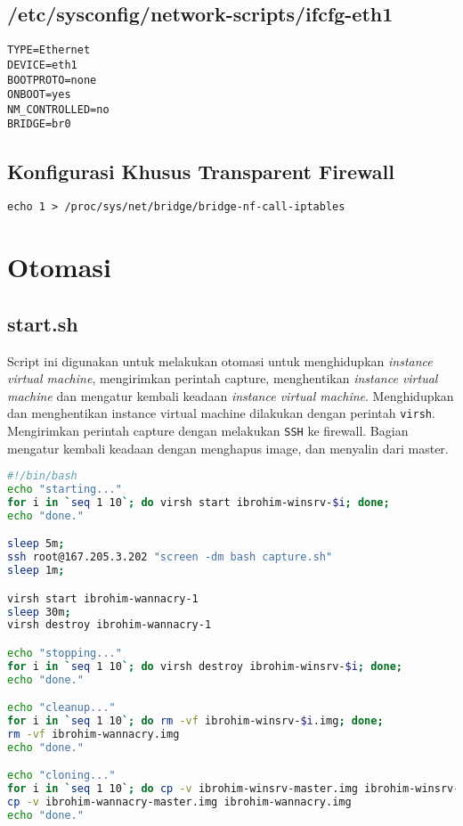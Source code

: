 \subsection{/etc/sysconfig/network-scripts/ifcfg-eth1}

\begin{lstlisting}
TYPE=Ethernet
DEVICE=eth1
BOOTPROTO=none
ONBOOT=yes
NM_CONTROLLED=no
BRIDGE=br0
\end{lstlisting}

\subsection{Konfigurasi Khusus Transparent Firewall}

\begin{lstlisting}
echo 1 > /proc/sys/net/bridge/bridge-nf-call-iptables
\end{lstlisting}

\section{Otomasi}

\subsection{start.sh}

Script ini digunakan untuk melakukan otomasi untuk menghidupkan \textit{instance virtual machine}, mengirimkan perintah capture, menghentikan \textit{instance virtual machine} dan mengatur kembali keadaan \textit{instance virtual machine}. Menghidupkan dan menghentikan instance virtual machine dilakukan dengan perintah \verb|virsh|. Mengirimkan perintah capture dengan melakukan \verb|SSH| ke firewall. Bagian mengatur kembali keadaan dengan menghapus image, dan menyalin dari master.

\begin{lstlisting}[language=Bash]
#!/bin/bash
echo "starting..."
for i in `seq 1 10`; do virsh start ibrohim-winsrv-$i; done;
echo "done."

sleep 5m;
ssh root@167.205.3.202 "screen -dm bash capture.sh"
sleep 1m;

virsh start ibrohim-wannacry-1
sleep 30m;
virsh destroy ibrohim-wannacry-1

echo "stopping..."
for i in `seq 1 10`; do virsh destroy ibrohim-winsrv-$i; done;
echo "done."

echo "cleanup..."
for i in `seq 1 10`; do rm -vf ibrohim-winsrv-$i.img; done;
rm -vf ibrohim-wannacry.img
echo "done."

echo "cloning..."
for i in `seq 1 10`; do cp -v ibrohim-winsrv-master.img ibrohim-winsrv-$i.img; done;
cp -v ibrohim-wannacry-master.img ibrohim-wannacry.img
echo "done."
\end{lstlisting}

